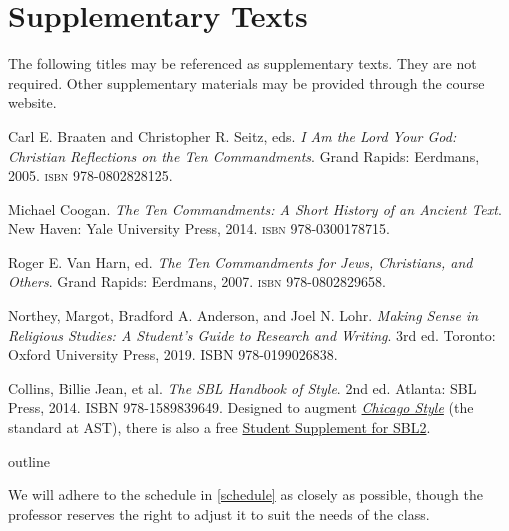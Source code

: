 \documentclass[titlepage]{article}
\begin{document}
\section{Supplementary Texts}
\label{supplementary}

The following titles may be referenced as supplementary texts. They are
not required. Other supplementary materials may be provided through the
course website.

\begingroup
\renewcommand{\section}[2]{}%
\begin{thebibliography}{3}%

	 Carl E. Braaten and Christopher R. Seitz, eds.
	\emph{I Am the Lord Your God: Christian Reflections on the Ten Commandments}.
	Grand Rapids: Eerdmans, 2005.
	\textsc{isbn} 978-0802828125.

	 Michael Coogan.
    \emph{The Ten Commandments: A Short History of an Ancient Text}.
    New Haven: Yale University Press, 2014.
    \textsc{isbn} 978-0300178715.

	 Roger E. Van Harn, ed.
	\emph{The Ten Commandments for Jews, Christians, and Others}.
	Grand Rapids: Eerdmans, 2007.
	\textsc{isbn} 978-0802829658.

	 Northey, Margot, Bradford A. Anderson, and Joel N. Lohr.
	\emph{Making Sense in Religious Studies: A Student's Guide to Research and Writing}.
	3rd ed. Toronto: Oxford University Press, 2019. ISBN 978-0199026838.

	 Collins, Billie Jean, et al.
	\emph{The SBL Handbook of Style}.
	2nd ed. Atlanta: SBL Press, 2014. ISBN 978-1589839649.
	Designed to augment \href{http://www.chicagomanualofstyle.org/home.html}{\emph{Chicago Style}}
	(the standard at AST), there is also a free
	\href{https://www.sbl-site.org/assets/pdfs/pubs/SBLHSsupp2015-02.pdf}{Student Supplement for SBL2}.


\end{thebibliography}
\endgroup

\section{Course Outline}
\label{outline}

We will adhere to the schedule in \autoref{schedule} as closely as
possible, though the professor reserves the right to adjust it to suit
the needs of the class.
\end{document}
